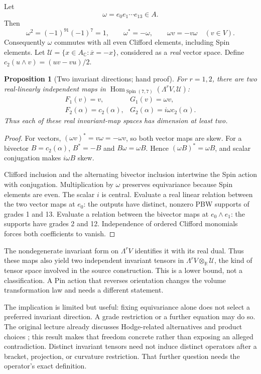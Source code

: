 \documentclass[11pt]{article}
\newtheorem{proposition}[theorem]{Proposition}
\newcommand{\R}{\mathbb R}
\newcommand{\C}{\mathbb C}
\newcommand{\Spin}{\operatorname{Spin}}
\begin{document}
Let
\[
 \omega=e_0e_1\cdots e_{13}\in A.
\]
Then
\[
 \omega^2=(-1)^{91}(-1)^7=1,\qquad \omega^*=-\omega,
 \qquad \omega v=-v\omega\quad(v\in V).
\]
Consequently $\omega$ commutes with all even Clifford elements, including Spin elements. Let $\mathcal U=\{x\in A_\C:\overline x=-x\}$, considered as a \emph{real} vector space. Define $c_2(u\wedge v)=(uv-vu)/2$.

\begin{proposition}[Two invariant directions; hand proof]
For $r=1,2$, there are two real-linearly independent maps in
$\operatorname{Hom}_{\Spin(7,7)}(\Lambda^rV,\mathcal U)$:
\[
 \begin{array}{ll}
 F_1(v)=v,&G_1(v)=\omega v,\\
 F_2(\alpha)=c_2(\alpha),&G_2(\alpha)=i\omega c_2(\alpha).
 \end{array}
\]
Thus each of these real invariant-map spaces has dimension at least two.
\end{proposition}
\begin{proof}
For vectors, $(\omega v)^*=v\omega=-\omega v$, so both vector maps are skew. For a bivector $B=c_2(\alpha)$, $B^*=-B$ and $B\omega=\omega B$. Hence $(\omega B)^*=\omega B$, and scalar conjugation makes $i\omega B$ skew.

Clifford inclusion and the alternating bivector inclusion intertwine the Spin action with conjugation. Multiplication by $\omega$ preserves equivariance because Spin elements are even. The scalar $i$ is central. Evaluate a real linear relation between the two vector maps at $e_0$: the outputs have distinct, nonzero PBW supports of grades 1 and 13. Evaluate a relation between the bivector maps at $e_0\wedge e_1$: the supports have grades 2 and 12. Independence of ordered Clifford monomials forces both coefficients to vanish.
\end{proof}

The nondegenerate invariant form on $\Lambda^rV$ identifies it with its real dual. Thus these maps also yield two independent invariant tensors in $\Lambda^rV\otimes_\R\mathcal U$, the kind of tensor space involved in the source construction. This is a lower bound, not a classification. A Pin action that reverses orientation changes the volume transformation law and needs a different statement.

The implication is limited but useful: fixing equivariance alone does not select a preferred invariant direction. A grade restriction or a further equation may do so. The original lecture already discusses Hodge-related alternatives and product choices \cite{lecture}; this result makes that freedom concrete rather than exposing an alleged contradiction. Distinct invariant tensors need not induce distinct operators after a bracket, projection, or curvature restriction. That further question needs the operator's exact definition.
\end{document}
